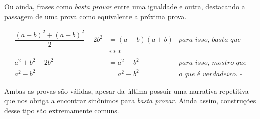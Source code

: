 Ou ainda, frases como \textit{basta provar} entre uma igualdade e outra, destacando a passagem de uma prova como equivalente a próxima prova.

  \begin{equation*}
    \begin{aligned}
      \dfrac{(a+b)^2+(a-b)^2}{2}-2b^2 &= (a-b)(a+b) & \textit{para isso, basta que} \\
      &***&\\
      a^2+b^2-2b^2 &= a^2-b^2 & \textit{para isso, mostro que} \\
      a^2-b^2 &= a^2-b^2 & \textit{o que é verdadeiro. } \square
    \end{aligned}
  \end{equation*}

\noindent Ambas as provas são válidas, apesar da última possuir uma narrativa repetitiva que nos obriga a encontrar sinônimos para \textit{basta provar}. Ainda assim, construções desse tipo são extremamente comuns.




